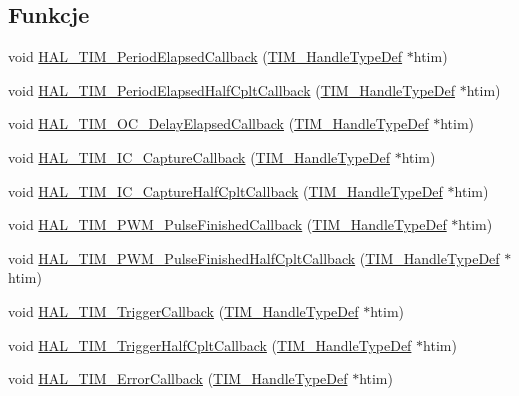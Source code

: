 \subsection*{Funkcje}
\begin{DoxyCompactItemize}
\item 
void \hyperlink{group___t_i_m___exported___functions___group9_ga8a3b0ad512a6e6c6157440b68d395eac}{H\+A\+L\+\_\+\+T\+I\+M\+\_\+\+Period\+Elapsed\+Callback} (\hyperlink{struct_t_i_m___handle_type_def}{T\+I\+M\+\_\+\+Handle\+Type\+Def} $\ast$htim)
\item 
void \hyperlink{group___t_i_m___exported___functions___group9_ga1f7478d689916e5888f62f97cf4acef3}{H\+A\+L\+\_\+\+T\+I\+M\+\_\+\+Period\+Elapsed\+Half\+Cplt\+Callback} (\hyperlink{struct_t_i_m___handle_type_def}{T\+I\+M\+\_\+\+Handle\+Type\+Def} $\ast$htim)
\item 
void \hyperlink{group___t_i_m___exported___functions___group9_ga1fc39499fe9db8b7fb88005e9f107a36}{H\+A\+L\+\_\+\+T\+I\+M\+\_\+\+O\+C\+\_\+\+Delay\+Elapsed\+Callback} (\hyperlink{struct_t_i_m___handle_type_def}{T\+I\+M\+\_\+\+Handle\+Type\+Def} $\ast$htim)
\item 
void \hyperlink{group___t_i_m___exported___functions___group9_ga77a2401a35ddd9bd0b8fc28331b81381}{H\+A\+L\+\_\+\+T\+I\+M\+\_\+\+I\+C\+\_\+\+Capture\+Callback} (\hyperlink{struct_t_i_m___handle_type_def}{T\+I\+M\+\_\+\+Handle\+Type\+Def} $\ast$htim)
\item 
void \hyperlink{group___t_i_m___exported___functions___group9_ga25ada83fb758075401f1bb9ba1925322}{H\+A\+L\+\_\+\+T\+I\+M\+\_\+\+I\+C\+\_\+\+Capture\+Half\+Cplt\+Callback} (\hyperlink{struct_t_i_m___handle_type_def}{T\+I\+M\+\_\+\+Handle\+Type\+Def} $\ast$htim)
\item 
void \hyperlink{group___t_i_m___exported___functions___group9_ga07e5fc4d223b16bec2fd6bed547cf91d}{H\+A\+L\+\_\+\+T\+I\+M\+\_\+\+P\+W\+M\+\_\+\+Pulse\+Finished\+Callback} (\hyperlink{struct_t_i_m___handle_type_def}{T\+I\+M\+\_\+\+Handle\+Type\+Def} $\ast$htim)
\item 
void \hyperlink{group___t_i_m___exported___functions___group9_gaf669ea0eacb07d5fee199704b612841f}{H\+A\+L\+\_\+\+T\+I\+M\+\_\+\+P\+W\+M\+\_\+\+Pulse\+Finished\+Half\+Cplt\+Callback} (\hyperlink{struct_t_i_m___handle_type_def}{T\+I\+M\+\_\+\+Handle\+Type\+Def} $\ast$htim)
\item 
void \hyperlink{group___t_i_m___exported___functions___group9_ga189577c72b1963671b26820d8161d678}{H\+A\+L\+\_\+\+T\+I\+M\+\_\+\+Trigger\+Callback} (\hyperlink{struct_t_i_m___handle_type_def}{T\+I\+M\+\_\+\+Handle\+Type\+Def} $\ast$htim)
\item 
void \hyperlink{group___t_i_m___exported___functions___group9_ga6fb4827960b3fcbc72f81152c3c7a2c3}{H\+A\+L\+\_\+\+T\+I\+M\+\_\+\+Trigger\+Half\+Cplt\+Callback} (\hyperlink{struct_t_i_m___handle_type_def}{T\+I\+M\+\_\+\+Handle\+Type\+Def} $\ast$htim)
\item 
void \hyperlink{group___t_i_m___exported___functions___group9_ga6f0868af383d592940700dbb52fac016}{H\+A\+L\+\_\+\+T\+I\+M\+\_\+\+Error\+Callback} (\hyperlink{struct_t_i_m___handle_type_def}{T\+I\+M\+\_\+\+Handle\+Type\+Def} $\ast$htim)
\end{DoxyCompactItemize}


